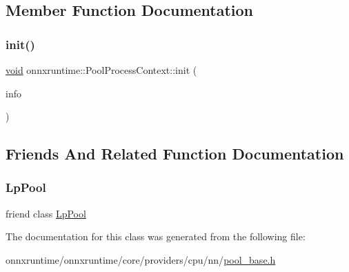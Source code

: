 \subsection{Member Function Documentation}
\mbox{\label{classonnxruntime_1_1PoolProcessContext_a75d5293a62f4339dd6d5465e65d9bba7}} 
\subsubsection{\texorpdfstring{init()}{init()}}
{\footnotesize\ttfamily \mbox{\hyperlink{mlasi_8h_a88f941d423cb2a819b70a1358982b1a6}{void}} onnxruntime\+::\+Pool\+Process\+Context\+::init (\begin{DoxyParamCaption}\item[{const \mbox{\hyperlink{classonnxruntime_1_1OpKernelInfo}{Op\+Kernel\+Info}} \&}]{info }\end{DoxyParamCaption})\hspace{0.3cm}{\ttfamily [inline]}}



\subsection{Friends And Related Function Documentation}
\mbox{\label{classonnxruntime_1_1PoolProcessContext_ad1a23cb95ca49d58d971e65541581aa9}} 
\subsubsection{\texorpdfstring{Lp\+Pool}{LpPool}}
{\footnotesize\ttfamily friend class \mbox{\hyperlink{classonnxruntime_1_1LpPool}{Lp\+Pool}}\hspace{0.3cm}{\ttfamily [friend]}}



The documentation for this class was generated from the following file\+:\begin{DoxyCompactItemize}
\item 
onnxruntime/onnxruntime/core/providers/cpu/nn/\mbox{\hyperlink{pool__base_8h}{pool\+\_\+base.\+h}}\end{DoxyCompactItemize}
